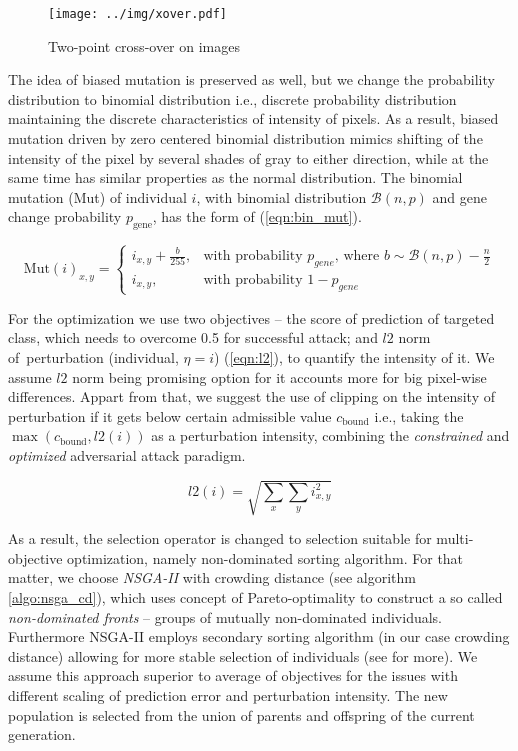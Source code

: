 \begin{figure}
    \centering
    \texttt{[image: ../img/xover.pdf]}
    \caption{Two-point cross-over on images}
    \label{fig:xover}
\end{figure}

The idea of biased mutation is preserved as well, but we change the probability distribution to binomial distribution i.e., discrete probability distribution maintaining the discrete characteristics of intensity of pixels. As a result, biased mutation driven by zero centered binomial distribution mimics shifting of the intensity of the pixel by several shades of gray to either direction, while at the same time has similar properties as the normal distribution. The binomial mutation (Mut) of individual $i$, with binomial distribution $\mathcal{B}(n, p)$ and gene change probability $p_\text{gene}$, has the form of (\ref{eqn:bin_mut}).

\begin{equation} \label{eqn:bin_mut}
\text{Mut}(i)_{x,y} =
\begin{cases}
    i_{x, y} + \frac{b}{255}, & \text{with probability } p_{gene} \text{, where } b \sim \mathcal{B}(n, p) - \frac{n}{2}\\
    i_{x, y}, & \text{with probability } 1 - p_{gene}
\end{cases}
\end{equation}

For the optimization we use two objectives -- the score of prediction of targeted class, which needs to overcome 0.5 for successful attack; and $l2$ norm of~perturbation (individual, $\eta = i$) (\ref{eqn:l2}), to quantify the intensity of it. We assume $l2$ norm being promising option for it accounts more for big pixel-wise differences. Appart from that, we suggest the use of clipping on the intensity of perturbation if it gets below certain admissible value $c_\text{bound}$ i.e., taking the $\max(c_\text{bound}, l2(i))$ as a perturbation intensity, combining the \emph{constrained} and \emph{optimized} adversarial attack paradigm.

\begin{equation} \label{eqn:l2}
l2(i) = \sqrt{\sum\limits_x\sum\limits_y i_{x, y}^2}
\end{equation}

As a result, the selection operator is changed to selection suitable for multi-objective optimization, namely non-dominated sorting algorithm. For that matter, we choose \emph{NSGA-II} with crowding distance (see algorithm \ref{algo:nsga_cd}), which uses concept of Pareto-optimality to construct a so called \emph{non-dominated fronts} -- groups of mutually non-dominated individuals. Furthermore NSGA-II employs secondary sorting algorithm (in our case crowding distance) allowing for more stable selection of individuals (see \cite{nsga} for more). We assume this approach superior to average of objectives for the issues with different scaling of prediction error and perturbation intensity. The new population is selected from the union of parents and offspring of the current generation.

